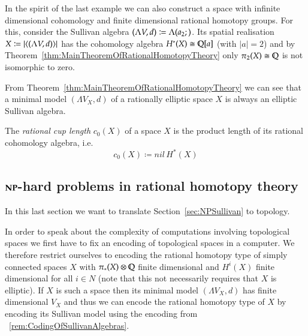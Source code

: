 \begin{Example}
  In the spirit of the last example we can also construct a space with infinite dimensional cohomology and 
  finite dimensional rational homotopy groups. For this, consider the Sullivan algebra 
  $(\Lambda V,d) \coloneqq \Lambda(a_2 ;)$. Its spatial realisation $ X \coloneqq | \langle (\Lambda V,d) \rangle |$ has the cohomology
  algebra $H^*(X) \cong \mathbb{Q}[a]$ (with $|a| = 2$) and by Theorem~\ref{thm:MainTheoremOfRationalHomotopyTheory} only
  $\pi_2(X) \cong \mathbb{Q}$ is not isomorphic to zero.
 \end{Example}



\begin{Remark}
 From Theorem~\ref{thm:MainTheoremOfRationalHomotopyTheory} we can see that a minimal model $(\Lambda V_X,d)$ of a
 rationally elliptic space $X$ is always an elliptic Sullivan algebra.
\end{Remark}



\begin{Definition}
 The \emph{rational cup length} $c_0 (X)$ of a space $X$ is the product length of its rational cohomology algebra,
 i.e. 
 $$ c_0 (X) \coloneqq nil \, H^*(X) $$
\end{Definition}



\subsection{$\mathbf{NP}$-hard problems in rational homotopy theory}

In this last section we want to translate Section~\ref{sec:NPSullivan} to topology.

\begin{Remark}
 In order to speak about the complexity of computations involving topological spaces we first have to
 fix an encoding of topological spaces in a computer. We therefore restrict ourselves to encoding the
 rational homotopy type of simply connected
 spaces $X$ with $\pi_*(X) \otimes \mathbb{Q}$ finite dimensional and $H^i(X)$ finite dimensional for all $i \in N$
 (note that this not necessarily requires that $X$ is elliptic). If $X$ is such a space then
 its minimal model $(\Lambda V_X, d)$ has finite dimensional $V_X$ and thus
 we can encode the rational homotopy type of $X$ by encoding its Sullivan model using the encoding from 
~\ref{rem:CodingOfSullivanAlgebras}. 
\end{Remark}

